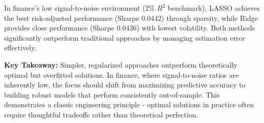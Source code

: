 \documentclass[12pt]{article}
\begin{document}
In finance's low signal-to-noise environment (2\% $R^2$ benchmark), LASSO achieves the best risk-adjusted performance (Sharpe 0.0442) through sparsity, while Ridge provides close performance (Sharpe 0.0436) with lowest volatility. Both methods significantly outperform traditional approaches by managing estimation error effectively.

\textbf{Key Takeaway:} Simpler, regularized approaches outperform theoretically optimal but overfitted solutions. In finance, where signal-to-noise ratios are inherently low, the focus should shift from maximizing predictive accuracy to building robust models that perform consistently out-of-sample. This demonstrates a classic engineering principle - optimal solutions in practice often require thoughtful tradeoffs rather than theoretical perfection.
\end{document}
